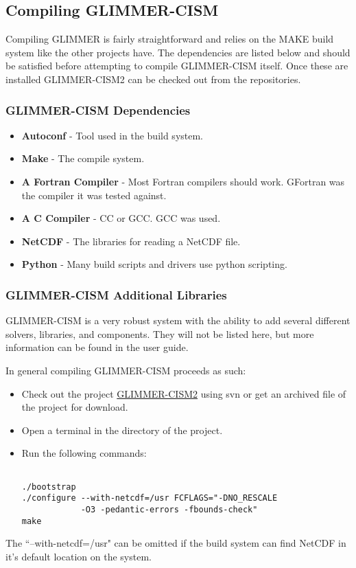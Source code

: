 \subsection{Compiling GLIMMER-CISM}
Compiling GLIMMER is fairly straightforward and relies on the MAKE build system like the other projects have.  The dependencies are listed below and should be satisfied before attempting to compile GLIMMER-CISM itself.  Once these are installed GLIMMER-CISM2 can be checked out from the repositories. \citeauthor{cism:website}

\subsubsection{GLIMMER-CISM Dependencies}
    \begin{itemize}
        \item \textbf{Autoconf} - Tool used in the build system.
        \item \textbf{Make} - The compile system. 
        \item \textbf{A Fortran Compiler} - Most Fortran compilers should work.  GFortran was the compiler it was tested against.
        \item \textbf{A C Compiler} - CC or GCC.  GCC was used.
        \item \textbf{NetCDF} - The libraries for reading a NetCDF file.
        \item \textbf{Python} - Many build scripts and drivers use python scripting.
    \end{itemize}

\subsubsection{GLIMMER-CISM Additional Libraries}
GLIMMER-CISM is a very robust system with the ability to add several different solvers, libraries, and components.  They will not be listed here, but more information can be found in the user guide. \cite{glimmerdoc}

In general compiling GLIMMER-CISM proceeds as such:
\begin{itemize}
    \item Check out the project \href{http://svn.berlios.de/svnroot/repos/glimmer-cism/glimmer-cism2/}{GLIMMER-CISM2} using svn or get an archived file of the project for download.
    \item Open a terminal in the directory of the project.
    \item Run the following commands:

\begin{framecode}{6in}
\begin{verbatim}

./bootstrap 
./configure --with-netcdf=/usr FCFLAGS="-DNO_RESCALE 
            -O3 -pedantic-errors -fbounds-check" 
make  

\end{verbatim}
\end{framecode}

\end{itemize}
The ``--with-netcdf=/usr" can be omitted if the build system can find NetCDF in it's default location on the system.
\citep{cism:website}

